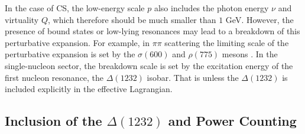 \documentclass[preprints,review,accept,moreauthors,pdftex]{Definitions/mdpi}
\begin{document}
In the case of CS, the low-energy scale $p$ also includes the photon energy $\nu$ and virtuality $Q$, which therefore should be much smaller than $1$ GeV. 
However, the presence of bound states or low-lying resonances may lead to a breakdown of this perturbative expansion.   For example, in $\pi \pi$ scattering the limiting scale of the perturbative expansion is set by the $\sigma(600)$ and $\rho(775)$ mesons  \cite{Colangelo:2001df,Caprini:2005an}. In the single-nucleon sector, the breakdown
scale is set by the excitation energy of the first nucleon resonance, the $\Delta(1232)$ isobar.  
That is unless the $\Delta(1232)$ is included explicitly in the effective Lagrangian.



\subsection{Inclusion of the $\Delta(1232)$ and Power Counting}\label{DeltaPC}
\end{document}
